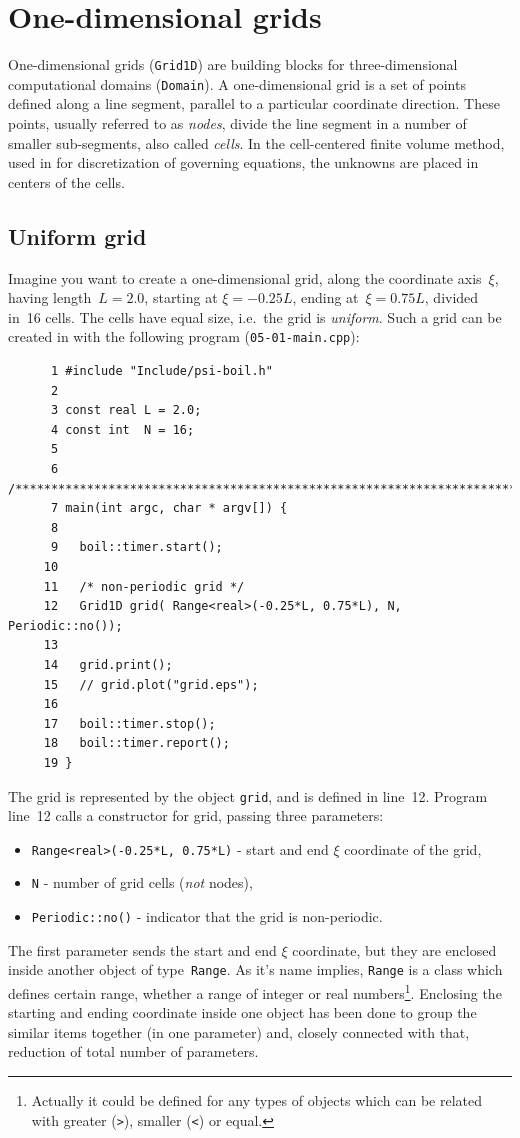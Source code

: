 \section{One-dimensional grids}
\label{sec_one-dimensional}

One-dimensional grids ({\tt Grid1D}) are building blocks for three-dimensional 
computational domains ({\tt Domain}). A one-dimensional grid is a set of
points defined along a line segment, parallel to a particular coordinate 
direction. These points, usually referred to as {\em nodes}, divide the line 
segment in a number of smaller sub-segments, also called {\em cells}.
%
In the cell-centered finite volume method, used in {\psiboil} for 
discretization of governing equations, the unknowns are placed in centers
of the cells. 

\subsection{Uniform grid}
\label{sub_sec_uniform}

Imagine you want to create a one-dimensional grid, along the coordinate
axis~$\xi$, having length~$L=2.0$, starting at $\xi=-0.25 L$, ending 
at~$\xi=0.75 L$, divided in~16 cells. The cells have equal size, 
i.e.\ the grid is {\em uniform}. Such a grid can be created in {\psiboil}
with the following program ({\tt 05-01-main.cpp}):
%
{\small \begin{verbatim}
      1 #include "Include/psi-boil.h"
      2
      3 const real L = 2.0;
      4 const int  N = 16;
      5
      6 /****************************************************************************/
      7 main(int argc, char * argv[]) {
      8
      9   boil::timer.start();
     10
     11   /* non-periodic grid */
     12   Grid1D grid( Range<real>(-0.25*L, 0.75*L), N, Periodic::no());
     13
     14   grid.print();
     15   // grid.plot("grid.eps");
     16
     17   boil::timer.stop();
     18   boil::timer.report();
     19 }
\end{verbatim}}
%
The grid is represented by the object {\tt grid}, and is defined in line~12. 
Program line~12 calls a constructor for grid, passing three parameters:
%
\begin{itemize}
  \item {\tt Range<real>(-0.25*L, 0.75*L)} - start and end $\xi$ coordinate of the grid,
  \item {\tt N}                            - number of grid cells ({\em not} nodes),
  \item {\tt Periodic::no()}               - indicator that the grid is non-periodic.
\end{itemize}
%
The first parameter sends the start and end $\xi$ coordinate, but they are
enclosed inside another object of type~{\tt Range}. As it's name implies,
{\tt Range} is a class which defines certain range, whether a range of
integer or real numbers\footnote{Actually it could be defined for any types
of objects which can be related with greater ({\tt >}), smaller ({\tt <})
or equal.}. Enclosing the starting and ending coordinate inside one object has
been done to group the similar items together (in one parameter) and, closely
connected with that, reduction of total number of parameters. 

